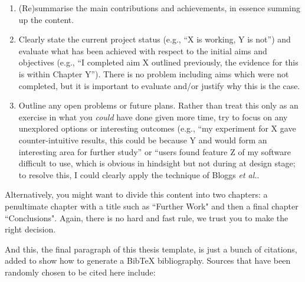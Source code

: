 \documentclass[ %
                    author={Carlos Duran Calle},
                supervisor={Dr. Felipe Campelo},
                    degree={MSc},
                     title={Comparative Machine Learning Analysis for Student Dropout Prediction in a Virtual Learning Environment},
                  subtitle={Incorporating Student Engagement and Socio-Economic Features},
                      type={},
                      year={2025}]{dissertation}
\begin{document}
\begin{enumerate}
\item (Re)summarise the main contributions and achievements, in essence
      summing up the content.
\item Clearly state the current project status (e.g., ``X is working, Y 
      is not'') and evaluate what has been achieved with respect to the 
      initial aims and objectives (e.g., ``I completed aim X outlined 
      previously, the evidence for this is within Chapter Y'').  There 
      is no problem including aims which were not completed, but it is 
      important to evaluate and/or justify why this is the case.
\item Outline any open problems or future plans.  Rather than treat this
      only as an exercise in what you {\em could} have done given more 
      time, try to focus on any unexplored options or interesting outcomes
      (e.g., ``my experiment for X gave counter-intuitive results, this 
      could be because Y and would form an interesting area for further 
      study'' or ``users found feature Z of my software difficult to use,
      which is obvious in hindsight but not during at design stage; to 
      resolve this, I could clearly apply the technique of Bloggs {\em et al.}.
\end{enumerate}

Alternatively, you might want to divide this content into two chapters: a penultimate chapter with a title such as ``Further Work" and then a final chapter ``Conclusions". Again, there is no hard and fast rule, we trust you to make the right decision. 

And this, the final paragraph of this thesis template, is just a bunch of citations, added to show how to generate a BibTeX bibliography. Sources that have been randomly chosen to be cited here include:





%
%
\end{document}

